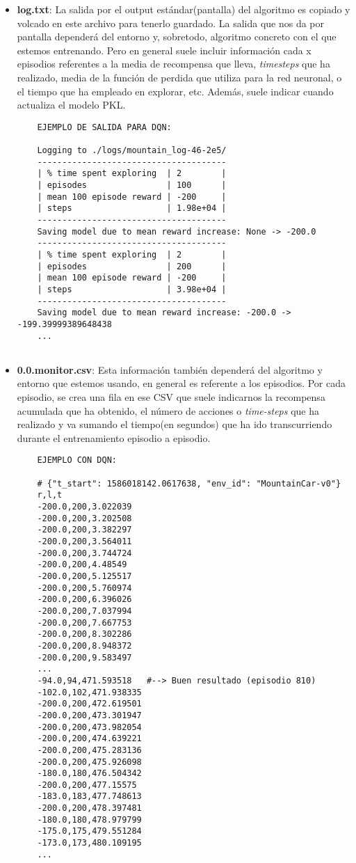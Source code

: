 \documentclass[11pt,fleqn]{book} %
\begin{document}
\begin{itemize}
	\item \textbf{log.txt}: La salida por el output estándar(pantalla) del algoritmo es copiado y volcado en este archivo para tenerlo guardado. La salida que nos da por pantalla dependerá del entorno y, sobretodo, algoritmo concreto con el que estemos entrenando. Pero en general suele incluir información cada x episodios referentes a la media de recompensa que lleva, \textit{timesteps} que ha realizado, media de la función de perdida que utiliza para la red neuronal, o el tiempo que ha empleado en explorar, etc. Además, suele indicar cuando actualiza el modelo PKL.\\
	
	\begin{verbatim}
	EJEMPLO DE SALIDA PARA DQN:
	
	Logging to ./logs/mountain_log-46-2e5/
	--------------------------------------
	| % time spent exploring  | 2        |
	| episodes                | 100      |
	| mean 100 episode reward | -200     |
	| steps                   | 1.98e+04 |
	--------------------------------------
	Saving model due to mean reward increase: None -> -200.0
	--------------------------------------
	| % time spent exploring  | 2        |
	| episodes                | 200      |
	| mean 100 episode reward | -200     |
	| steps                   | 3.98e+04 |
	--------------------------------------
	Saving model due to mean reward increase: -200.0 -> -199.39999389648438
	...
	
	\end{verbatim}
	
	\item \textbf{0.0.monitor.csv}: Esta información también dependerá del algoritmo y entorno que estemos usando, en general es referente a los episodios. Por cada episodio, se crea una fila en ese CSV que suele indicarnos la recompensa acumulada que ha obtenido, el número de acciones o \textit{time-steps} que ha realizado y va sumando el tiempo(en segundos) que ha ido transcurriendo durante el entrenamiento episodio a episodio.\\
	
	\begin{verbatim}
	EJEMPLO CON DQN:
	
	# {"t_start": 1586018142.0617638, "env_id": "MountainCar-v0"} 
	r,l,t
	-200.0,200,3.022039
	-200.0,200,3.202508
	-200.0,200,3.382297
	-200.0,200,3.564011
	-200.0,200,3.744724
	-200.0,200,4.48549
	-200.0,200,5.125517
	-200.0,200,5.760974
	-200.0,200,6.396026
	-200.0,200,7.037994
	-200.0,200,7.667753
	-200.0,200,8.302286
	-200.0,200,8.948372
	-200.0,200,9.583497
	...
	-94.0,94,471.593518   #--> Buen resultado (episodio 810)
	-102.0,102,471.938335
	-200.0,200,472.619501
	-200.0,200,473.301947
	-200.0,200,473.982054
	-200.0,200,474.639221
	-200.0,200,475.283136
	-200.0,200,475.926098
	-180.0,180,476.504342
	-200.0,200,477.15575
	-183.0,183,477.748613
	-200.0,200,478.397481
	-180.0,180,478.979799
	-175.0,175,479.551284
	-173.0,173,480.109195
	...
	\end{verbatim}
	

\end{itemize}
\end{document}
